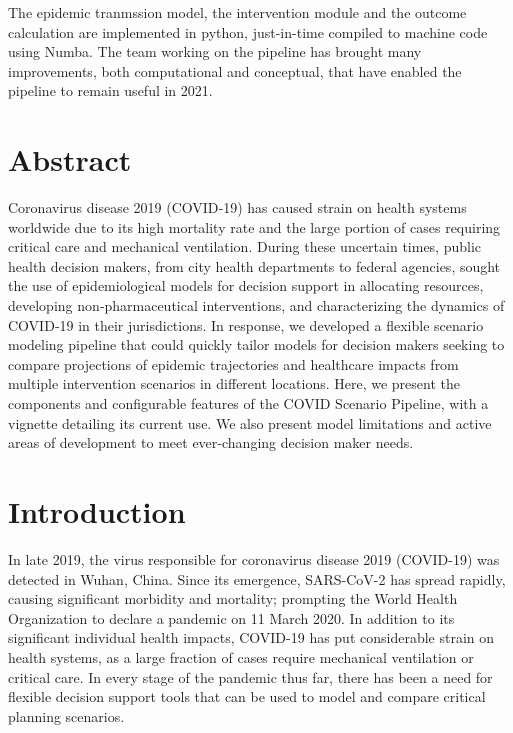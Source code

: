 The epidemic tranmssion model, the intervention module and the outcome calculation are implemented in python, just-in-time compiled to machine code using Numba\cite{Lam:NumbaLLVMbasedPython:2015}. The team working on the pipeline has brought many improvements, both computational and conceptual, that have enabled the pipeline to remain useful in 2021. 

\section{Abstract}
Coronavirus disease 2019 (COVID‑19) has caused strain on health systems worldwide due to its high mortality rate and the large portion of cases requiring critical care and mechanical ventilation. During these uncertain times, public health decision makers, from city health departments to federal agencies, sought the use of epidemiological models for decision support in allocating resources, developing non‑pharmaceutical interventions, and characterizing the dynamics of COVID‑19 in their jurisdictions. In response, we developed a flexible scenario modeling pipeline that could quickly tailor models for decision makers seeking to compare projections of epidemic trajectories and healthcare impacts from multiple intervention scenarios in different locations. Here, we present the components and configurable features of the COVID Scenario Pipeline, with a vignette detailing its current use. We also present model limitations and active areas of development to meet ever‑changing decision maker needs.

\section{Introduction}

In late 2019, the virus responsible for coronavirus disease 2019 (COVID-19) was detected in Wuhan, China\cite{Zhu:NovelCoronavirusPatients:2020}. Since its emergence, SARS-CoV-2 has spread rapidly, causing significant morbidity and mortality; prompting the World Health Organization to declare a pandemic on 11 March 2020\cite{WHO:WHODirectorGeneralOpening}. In addition to its significant individual health impacts, COVID-19 has put considerable strain on health systems, as a large fraction of cases require mechanical ventilation or critical care\cite{Huang:ClinicalFeaturesPatients:2020}. In every stage of the pandemic thus far, there has been a need for flexible decision support tools that can be used to model and compare critical planning scenarios. 

